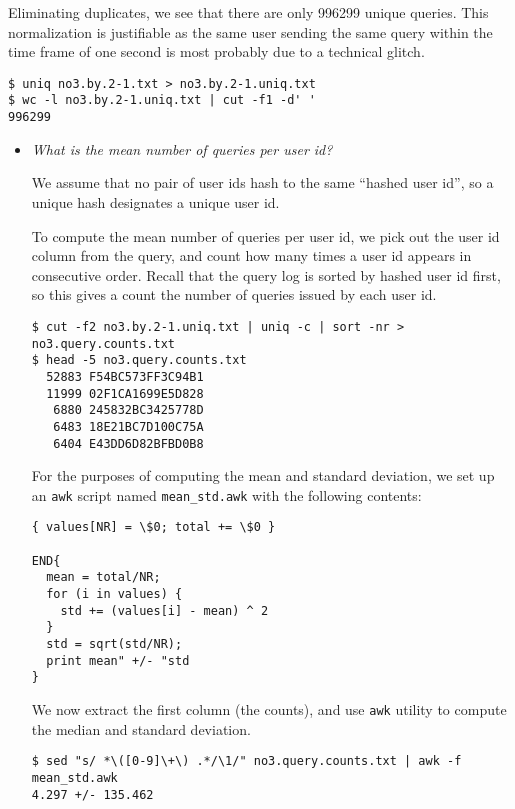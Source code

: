 Eliminating duplicates, we see that there are only 996299 unique queries. This
normalization is justifiable as the same user sending the same query within the
time frame of one second is most probably due to a technical glitch.

\begin{lstlisting}
$ uniq no3.by.2-1.txt > no3.by.2-1.uniq.txt
$ wc -l no3.by.2-1.uniq.txt | cut -f1 -d' '
996299
\end{lstlisting}

\begin{itemize}

\item \emph{What is the mean number of queries per user id?}

We assume that no pair of user ids hash to the same ``hashed user id'',
so a unique hash designates a unique user id.

To compute the mean number of queries per user id, we pick out the user id
column from the query, and count how many times a user id appears in
consecutive order. Recall that the query log is sorted by hashed user id first,
so this gives a count the number of queries issued by each user id.

\begin{lstlisting}
$ cut -f2 no3.by.2-1.uniq.txt | uniq -c | sort -nr > no3.query.counts.txt
$ head -5 no3.query.counts.txt 
  52883 F54BC573FF3C94B1
  11999 02F1CA1699E5D828
   6880 245832BC3425778D
   6483 18E21BC7D100C75A
   6404 E43DD6D82BFBD0B8
\end{lstlisting}

For the purposes of computing the mean and standard deviation, we set up an
\texttt{awk} script named \texttt{mean\_std.awk} with the following contents:

\begin{lstlisting}
{ values[NR] = \$0; total += \$0 }

END{
  mean = total/NR;
  for (i in values) {
    std += (values[i] - mean) ^ 2
  }
  std = sqrt(std/NR);
  print mean" +/- "std
}
\end{lstlisting}

We now extract the first column (the counts), and use \texttt{awk} utility to
compute the median and standard deviation.

\begin{lstlisting}
$ sed "s/ *\([0-9]\+\) .*/\1/" no3.query.counts.txt | awk -f mean_std.awk
4.297 +/- 135.462
\end{lstlisting}


\end{itemize}
